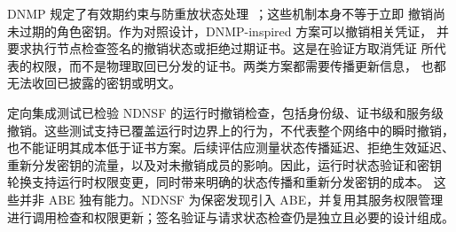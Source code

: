 DNMP 规定了有效期约束与防重放状态处理~\cite{dnmp}；这些机制本身不等于立即
撤销尚未过期的角色密钥。作为对照设计，DNMP-inspired 方案可以撤销相关凭证，
并要求执行节点检查签名的撤销状态或拒绝过期证书。这是在验证方取消凭证
所代表的权限，而不是物理取回已分发的证书。两类方案都需要传播更新信息，
也都无法收回已披露的密钥或明文。

定向集成测试已检验 NDNSF 的运行时撤销检查，包括身份级、证书级和服务级
撤销。这些测试支持已覆盖运行时边界上的行为，不代表整个网络中的瞬时撤销，
也不能证明其成本低于证书方案。后续评估应测量状态传播延迟、拒绝生效延迟、
重新分发密钥的流量，以及对未撤销成员的影响。因此，运行时状态验证和密钥
轮换支持运行时权限变更，同时带来明确的状态传播和重新分发密钥的成本。
这些并非 ABE 独有能力。NDNSF 为保密发现引入 ABE，并复用其服务权限管理
进行调用检查和权限更新；签名验证与请求状态检查仍是独立且必要的设计组成。
